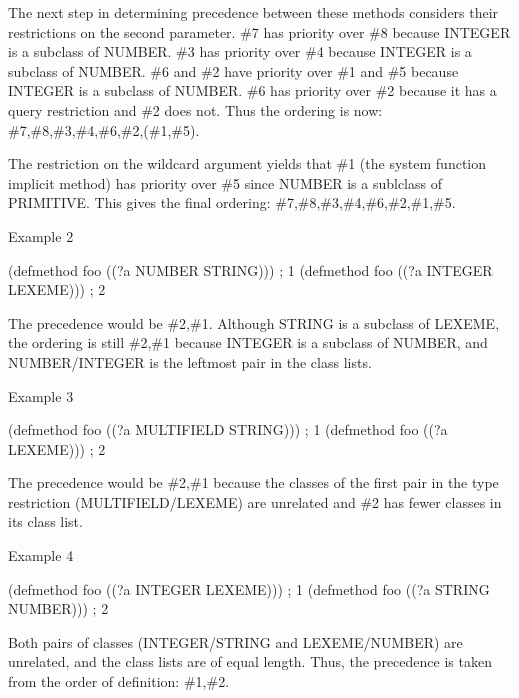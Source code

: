 \documentclass[letterpaper,10pt,english]{sphinxmanual}
\begin{document}
The next step in determining precedence between these methods considers
their restrictions on the second parameter. \#7 has priority over \#8
because INTEGER is a subclass of NUMBER. \#3 has priority over \#4 because
INTEGER is a subclass of NUMBER. \#6 and \#2 have priority over \#1 and \#5
because INTEGER is a subclass of NUMBER. \#6 has priority over \#2 because
it has a query restriction and \#2 does not. Thus the ordering is now:
\#7,\#8,\#3,\#4,\#6,\#2,(\#1,\#5).

The restriction on the wildcard argument yields that \#1 (the system
function implicit method) has priority over \#5 since NUMBER is a
sublclass of PRIMITIVE. This gives the final ordering:
\#7,\#8,\#3,\#4,\#6,\#2,\#1,\#5.

Example 2

\begin{sphinxVerbatim}[commandchars=\\\{\}]
(defmethod foo ((?a NUMBER STRING))) ; \PYGZsh{}1
(defmethod foo ((?a INTEGER LEXEME))) ; \PYGZsh{}2
\end{sphinxVerbatim}

The precedence would be \#2,\#1. Although STRING is a subclass of LEXEME,
the ordering is still \#2,\#1 because INTEGER is a subclass of NUMBER, and
NUMBER/INTEGER is the leftmost pair in the class lists.

Example 3

\begin{sphinxVerbatim}[commandchars=\\\{\}]
(defmethod foo ((?a MULTIFIELD STRING))) ; \PYGZsh{}1
(defmethod foo ((?a LEXEME))) ; \PYGZsh{}2
\end{sphinxVerbatim}

The precedence would be \#2,\#1 because the classes of the first pair in
the type restriction (MULTIFIELD/LEXEME) are unrelated and \#2 has fewer
classes in its class list.

Example 4

\begin{sphinxVerbatim}[commandchars=\\\{\}]
(defmethod foo ((?a INTEGER LEXEME))) ; \PYGZsh{}1
(defmethod foo ((?a STRING NUMBER))) ; \PYGZsh{}2
\end{sphinxVerbatim}

Both pairs of classes (INTEGER/STRING and LEXEME/NUMBER) are unrelated,
and the class lists are of equal length. Thus, the precedence is taken
from the order of definition: \#1,\#2.
\end{document}
